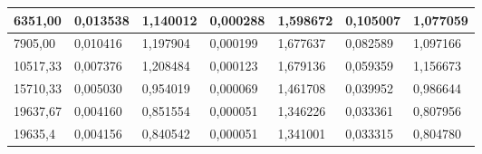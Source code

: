 \documentclass[14pt]{article}
\begin{document}
\begin{table}[H]
\begin{tabular}{|l|l|l|l|l|l|l|}
6351,00  & 0,013538 & 1,140012               & 0,000288 & 1,598672 & 0,105007 & 1,077059               \\ \hline
7905,00  & 0,010416 & 1,197904               & 0,000199 & 1,677637 & 0,082589 & 1,097166               \\ \hline
10517,33 & 0,007376 & 1,208484               & 0,000123 & 1,679136 & 0,059359 & 1,156673               \\ \hline
15710,33 & 0,005030 & 0,954019               & 0,000069 & 1,461708 & 0,039952 & 0,986644               \\ \hline
19637,67 & 0,004160 & 0,851554               & 0,000051 & 1,346226 & 0,033361 & 0,807956               \\ \hline
19635,4  & 0,004156 & 0,840542               & 0,000051 & 1,341001 & 0,033315 & 0,804780               \\ \hline
\end{tabular}

\end{table}
\newpage
\end{document}
